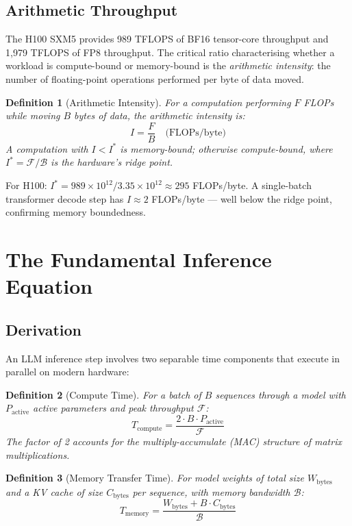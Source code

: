 \documentclass[11pt,a4paper]{article}
\newtheorem{definition}{Definition}
\newcommand{\Tcomp}{T_{\mathrm{compute}}}
\newcommand{\Tmem}{T_{\mathrm{memory}}}
\newcommand{\BW}{\mathcal{B}}
\newcommand{\FLOPS}{\mathcal{F}}
\begin{document}
\subsection{Arithmetic Throughput}

The H100 SXM5 provides 989 TFLOPS of BF16 tensor-core throughput and
1{,}979 TFLOPS of FP8 throughput. The critical ratio characterising whether
a workload is compute-bound or memory-bound is the \textit{arithmetic
intensity}: the number of floating-point operations performed per byte of
data moved.

\begin{definition}[Arithmetic Intensity]
\label{def:arith-intensity}
For a computation performing $F$ FLOPs while moving $B$ bytes of data,
the arithmetic intensity is:
\[
  I = \frac{F}{B} \quad \text{(FLOPs/byte)}
\]
A computation with $I < I^*$ is memory-bound; otherwise compute-bound,
where $I^* = \FLOPS / \BW$ is the hardware's ridge point.
\end{definition}

For H100: $I^* = 989 \times 10^{12} / 3.35 \times 10^{12} \approx 295$ FLOPs/byte.
A single-batch transformer decode step has $I \approx 2$ FLOPs/byte — well
below the ridge point, confirming memory boundedness.

\section{The Fundamental Inference Equation}
\label{sec:fundamental}

\subsection{Derivation}

An LLM inference step involves two separable time components that execute
in parallel on modern hardware:

\begin{definition}[Compute Time]
\label{def:tcompute}
For a batch of $B$ sequences through a model with $P_\text{active}$ active
parameters and peak throughput $\FLOPS$:
\[
  \Tcomp = \frac{2 \cdot B \cdot P_\text{active}}{\FLOPS}
\]
The factor of 2 accounts for the multiply-accumulate (MAC) structure of
matrix multiplications.
\end{definition}

\begin{definition}[Memory Transfer Time]
\label{def:tmemory}
For model weights of total size $W_\text{bytes}$ and a KV cache of size
$C_\text{bytes}$ per sequence, with memory bandwidth $\BW$:
\[
  \Tmem = \frac{W_\text{bytes} + B \cdot C_\text{bytes}}{\BW}
\]
\end{definition}
\end{document}
